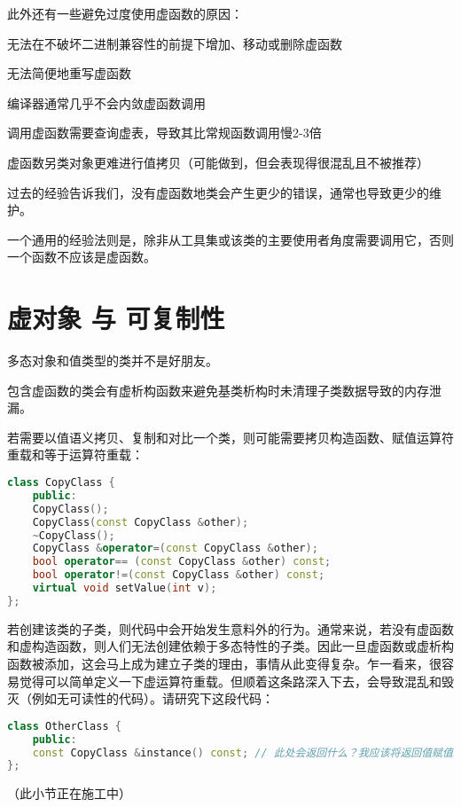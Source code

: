 此外还有一些避免过度使用虚函数的原因：

\begin{compactitem}
\item 无法在不破坏二进制兼容性的前提下增加、移动或删除虚函数
\item 无法简便地重写虚函数
\item 编译器通常几乎不会内敛虚函数调用
\item 调用虚函数需要查询虚表，导致其比常规函数调用慢2-3倍
\item 虚函数另类对象更难进行值拷贝（可能做到，但会表现得很混乱且不被推荐）
\end{compactitem}

过去的经验告诉我们，没有虚函数地类会产生更少的错误，通常也导致更少的维护。

一个通用的经验法则是，除非从工具集或该类的主要使用者角度需要调用它，否则一个函数不应该是虚函数。

\section{虚对象 与 可复制性}

多态对象和值类型的类并不是好朋友。

包含虚函数的类会有虚析构函数来避免基类析构时未清理子类数据导致的内存泄漏。

若需要以值语义拷贝、复制和对比一个类，则可能需要拷贝构造函数、赋值运算符重载和等于运算符重载：

\begin{lstlisting}[language=C++]
class CopyClass {
	public:
	CopyClass();
	CopyClass(const CopyClass &other);
	~CopyClass();
	CopyClass &operator=(const CopyClass &other);
	bool operator== (const CopyClass &other) const;
	bool operator!=(const CopyClass &other) const;
	virtual void setValue(int v);
};
\end{lstlisting}

若创建该类的子类，则代码中会开始发生意料外的行为。通常来说，若没有虚函数和虚构造函数，则人们无法创建依赖于多态特性的子类。因此一旦虚函数或虚析构函数被添加，这会马上成为建立子类的理由，事情从此变得复杂。乍一看来，很容易觉得可以简单定义一下虚运算符重载。但顺着这条路深入下去，会导致混乱和毁灭（例如无可读性的代码）。请研究下这段代码：

\begin{lstlisting}[language=C++]
class OtherClass {
	public:
	const CopyClass &instance() const; // 此处会返回什么？我应该将返回值赋值给谁？
};
\end{lstlisting}
（此小节正在施工中）


